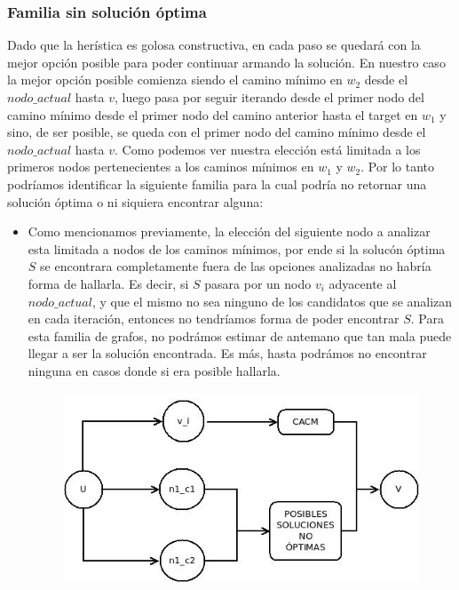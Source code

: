 \subsubsection{Familia sin soluci\'on \'optima}
Dado que la her\'istica es golosa constructiva, en cada paso se quedar\'a con la mejor opci\'on posible para poder continuar armando la soluci\'on. En nuestro caso la mejor opci\'on posible comienza siendo el camino m\'inimo en $w_2$ desde el $nodo\_actual$ hasta $v$, luego pasa por seguir iterando desde el primer nodo del camino m\'inimo desde el primer nodo del camino anterior hasta el target en $w_1$ y sino, de ser posible, se queda con el primer nodo del camino m\'inimo desde el $nodo\_actual$ hasta $v$. 
Como podemos ver nuestra elecci\'on est\'a limitada a los primeros nodos pertenecientes a los caminos m\'inimos en $w_1$ y $w_2$. Por lo tanto podr\'iamos identificar la siguiente familia para la cual podr\'ia no retornar una soluci\'on \'optima o ni siquiera encontrar alguna:

\begin{itemize}
\item Como mencionamos previamente, la elecci\'on del siguiente nodo a analizar esta limitada a nodos de los caminos m\'inimos, por ende si la soluc\'on \'optima $S$ se encontrara completamente fuera de las opciones analizadas no habr\'ia forma de hallarla. Es decir, si $S$ pasara por un nodo $v_i$ adyacente al $nodo\_actual$, y que el mismo no sea ninguno de los candidatos que se analizan en cada iteraci\'on, entonces no tendr\'iamos forma de poder encontrar $S$. 
Para esta familia de grafos, no podr\'amos estimar de antemano que tan mala puede llegar a ser la soluci\'on encontrada. Es m\'as, hasta podr\'amos no encontrar ninguna en casos donde si era posible hallarla.
\begin{figure}[!hp]
	\centering
 	\includegraphics[scale=0.6]{img/familia_greedy.jpeg}
\end{figure}
\end{itemize}

